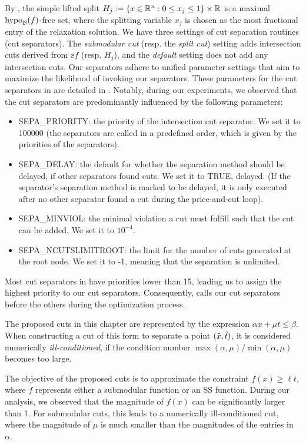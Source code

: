 By , the simple lifted split $H_j := \{x \in \mathbb R^n: 0 \le x_j \le 1\} \times \mathbb R$ is a maximal $\operatorname{hypo}_{\mathcal B}(f)$-free set,  where the splitting variable $x_j$ is chosen as the most fractional entry of the relaxation solution. We have three settings of  cut separation routines (cut separators). The \textit{submodular cut} (resp. the \textit{split cut}) setting  adds intersection cuts derived from  $\ee{f}$ (resp. $H_j$), and the \textit{default} setting does not add any intersection cuts. Our separators adhere to unified parameter settings that aim to maximize the likelihood of \scip invoking our separators.  These parameters for the cut separators in \scip are detailed in \cite{BibEntry2023Jul}. Notably, during our experiments, we observed that the cut separators are predominantly influenced by the following parameters:

\begin{itemize}
    \item SEPA\_PRIORITY: the priority of the intersection cut separator. We  set it to 100000 (the separators are called in a predefined order, which is given by the priorities of the separators).
    \item SEPA\_DELAY: the default for whether the separation method should be delayed, if other separators found cuts. We set it to TRUE, \ie delayed. (If the separator's separation method is marked to be delayed, it is only executed after no other separator  found a cut during the price-and-cut loop).
    \item SEPA\_MINVIOL: the minimal violation a cut must fulfill such that the cut can be added. We set it to $10^{-4}$.
    \item SEPA\_NCUTSLIMITROOT: the limit for the number of cuts generated at the root node. We  set it to -1, meaning that the separation is unlimited.
\end{itemize}

 Most cut separators in \scip have priorities lower than 15, leading us to assign the highest priority to our cut separators. Consequently, \scip calls our cut separators before the others during the optimization process.

The proposed cuts in this chapter are represented by the expression $\alpha x + \mu t \leq \beta$. When constructing a cut of this form to separate a point $(\tilde{x}, \tilde{t})$, it is considered numerically \emph{ill-conditioned}, if the condition number $\max(\alpha, \mu) / \min(\alpha, \mu)$ becomes too large.

The objective of the proposed cuts is to approximate the constraint $f(x) \geq \ell t$, where $f$ represents either a submodular function or an SS function. During our analysis, we observed that the magnitude of $f(x)$ can be significantly larger than 1. For submodular cuts, this leads to a numerically ill-conditioned cut, where the magnitude of $\mu$ is much smaller than the magnitudes of the entries in $\alpha$.

